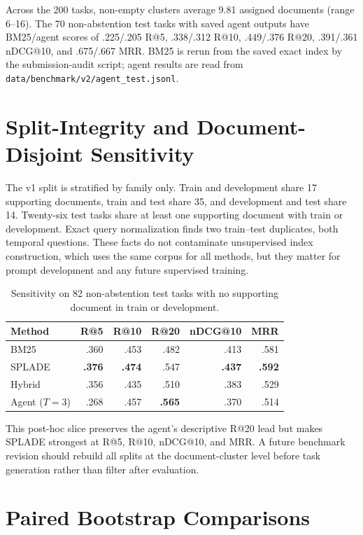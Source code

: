 \documentclass{article}
\begin{document}
Across the 200 tasks, non-empty clusters average 9.81 assigned documents (range 6--16). The 70 non-abstention test tasks with saved agent outputs have BM25/agent scores of .225/.205 R@5, .338/.312 R@10, .449/.376 R@20, .391/.361 nDCG@10, and .675/.667 MRR. BM25 is rerun from the saved exact index by the submission-audit script; agent results are read from \texttt{data/benchmark/v2/agent\_test.jsonl}.

\section{Split-Integrity and Document-Disjoint Sensitivity}
\label{app:split}

The v1 split is stratified by family only. Train and development share 17 supporting documents, train and test share 35, and development and test share 14. Twenty-six test tasks share at least one supporting document with train or development. Exact query normalization finds two train--test duplicates, both temporal questions. These facts do not contaminate unsupervised index construction, which uses the same corpus for all methods, but they matter for prompt development and any future supervised training.

\begin{table}[h]
\centering
\caption{Sensitivity on 82 non-abstention test tasks with no supporting document in train or development.}
\label{tab:disjoint}
\small
\begin{tabular}{lrrrrr}
\toprule
Method & R@5 & R@10 & R@20 & nDCG@10 & MRR \\
\midrule
BM25 & .360 & .453 & .482 & .413 & .581 \\
SPLADE & \textbf{.376} & \textbf{.474} & .547 & \textbf{.437} & \textbf{.592} \\
Hybrid & .356 & .435 & .510 & .383 & .529 \\
Agent ($T{=}3$) & .268 & .457 & \textbf{.565} & .370 & .514 \\
\bottomrule
\end{tabular}
\end{table}

This post-hoc slice preserves the agent's descriptive R@20 lead but makes SPLADE strongest at R@5, R@10, nDCG@10, and MRR. A future benchmark revision should rebuild all splits at the document-cluster level before task generation rather than filter after evaluation.

\section{Paired Bootstrap Comparisons}
\label{app:stats}
\end{document}
